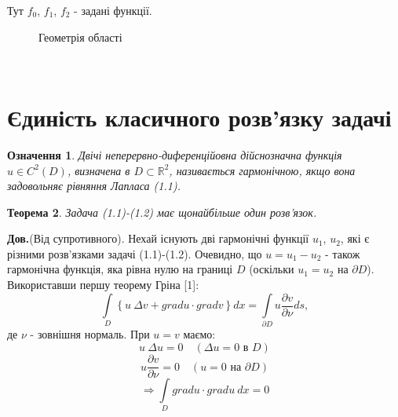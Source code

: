 \documentclass[a4 paper,12pt,ukrainian]{report}
\newtheorem{theorem}{\textbf{Теорема}}[chapter]
\newtheorem{determination}[theorem]{\textbf{Означення}}
\begin{document}
Тут $f_0$, $f_1$, $f_2$ - задані функції.\\
\begin{figure}[h]
\caption{Геометрія області}
\label{fig:image}
\end{figure}\\


\section{Єдиність класичного розв'язку задачі}
\begin{determination}
Двічі неперервно-диференційовна дійснозначна функція $u\in C^2(D)$, визначена в $D\subset\mathbb{R}^2$, називається гармонічною, якщо вона задовольняє рівняння Лапласа (1.1).
\end{determination}
\begin{theorem}
Задача (1.1)-(1.2) має щонайбільше один розв'язок.
\end{theorem}
\textbf{Дов.}(Від супротивного). Нехай існують дві гармонічні функції $u_1$, $u_2$, які є різними розв'язками задачі (1.1)-(1.2). Очевидно, що $u=u_1-u_2$ - також гармонічна функція, яка рівна нулю на границі $D$ (оскільки $u_1=u_2$ на $\partial D$).\\
\hspace*{\parindent}Використавши першу теорему Гріна [1]:
\begin{equation*}
\int\limits_{D}\left\{u \ \Delta v+gradu\cdot gradv\right\}dx=\int\limits_{\partial D}u\frac{\partial v}{\partial\nu}ds,
\end{equation*}
де $\nu$ - зовнішня нормаль. При $u=v$ маємо:
\begin{equation*}
u \ \Delta u=0 \quad (\Delta u=0\text{ в }D)
\end{equation*}
\begin{equation*}
u\frac{\partial v}{\partial\nu}=0 \quad (u=0\text{ на }\partial D)
\end{equation*}
\begin{equation*}
\Rightarrow\int\limits_{D}gradu\cdot gradu \ dx=0
\end{equation*}
\end{document}
